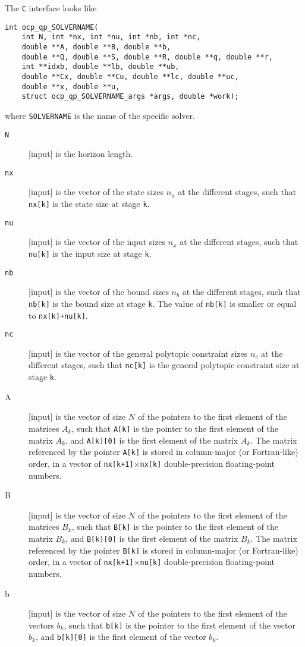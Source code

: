 \documentclass{report}
\begin{document}
The \texttt{C} interface looks like
\begin{verbatim}
int ocp_qp_SOLVERNAME(
    int N, int *nx, int *nu, int *nb, int *nc, 
    double **A, double **B, double **b, 
    double **Q, double **S, double **R, double **q, double **r, 
    int **idxb, double **lb, double **ub, 
    double **Cx, double **Cu, double **lc, double **uc, 
    double **x, double **u,
    struct ocp_qp_SOLVERNAME_args *args, double *work);
\end{verbatim}
where {\tt SOLVERNAME} is the name of the specific solver.
\begin{description}
\item[{\tt N}] [input] is the horizon length.
\item[{\tt nx}] [input] is the vector of the state sizes $n_u$ at the different stages, such that {\tt nx[k]} is the state size at stage {\tt k}.
\item[{\tt nu}] [input] is the vector of the input sizes $n_x$ at the different stages, such that {\tt nu[k]} is the input size at stage {\tt k}.
\item[{\tt nb}] [input] is the vector of the bound sizes $n_b$ at the different stages, such that {\tt nb[k]} is the bound size at stage {\tt k}.
The value of {\tt nb[k]} is smaller or equal to {\tt nx[k]+nu[k]}.
\item[{\tt nc}] [input] is the vector of the general polytopic constraint sizes $n_c$ at the different stages, such that {\tt nc[k]} is the general polytopic constraint size at stage {\tt k}.
\item[A] [input] is the vector of size $N$ of the pointers to the first element of the matrices $A_k$, such that {\tt A[k]} is the pointer to the first element of the matrix $A_k$, and {\tt A[k][0]} is the first element of the matrix $A_k$.
The matrix referenced by the pointer {\tt A[k]} is stored in column-major (or Fortran-like) order, in a vector of {\tt nx[k+1]$\times$nx[k]} double-precision floating-point numbers.
\item[B] [input] is the vector of size $N$ of the pointers to the first element of the matrices $B_k$, such that {\tt B[k]} is the pointer to the first element of the matrix $B_k$, and {\tt B[k][0]} is the first element of the matrix $B_k$.
The matrix referenced by the pointer {\tt B[k]} is stored in column-major (or Fortran-like) order, in a vector of {\tt nx[k+1]$\times$nu[k]} double-precision floating-point numbers.
\item[b] [input] is the vector of size $N$ of the pointers to the first element of the vectors $b_k$, such that {\tt b[k]} is the pointer to the first element of the vector $b_k$, and {\tt b[k][0]} is the first element of the vector $b_k$.

\end{description}
\end{document}
